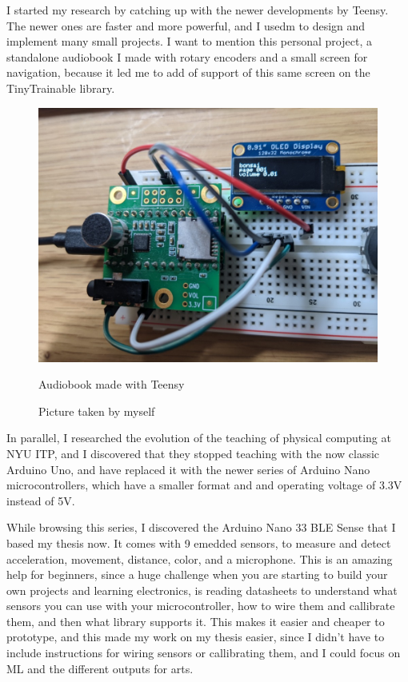 I started my research by catching up with the newer developments by Teensy. The newer ones are faster and more powerful, and I usedm to design and implement many small projects. I want to mention this personal project, a standalone audiobook I made with rotary encoders and a small screen for navigation, because it led me to add of support of this same screen on the TinyTrainable library.

\begin{figure}[ht]
  \centering
  \includegraphics[width=0.75\linewidth,height=0.40\textheight,keepaspectratio]{images/bonsai.jpg}
  \caption{Audiobook made with Teensy}
  \caption*{Picture taken by myself}
  \label{fig:bonsai-audiobook}
\end{figure}

In parallel, I researched the evolution of the teaching of physical computing at \acrshort{NYU} \acrshort{ITP}, and I discovered that they stopped teaching with the now classic Arduino Uno, and have replaced it with the newer series of Arduino Nano microcontrollers, which have a smaller format and and operating voltage of 3.3V instead of 5V.

While browsing this series, I discovered the Arduino Nano 33 \acrshort{BLE} Sense that I based my thesis now. It comes with 9 emedded sensors, to measure and detect acceleration, movement, distance, color, and a microphone. This is an amazing help for beginners, since a huge challenge when you are starting to build your own projects and learning electronics, is reading datasheets to understand what sensors you can use with your microcontroller, how to wire them and callibrate them, and then what library supports it. This makes it easier and cheaper to prototype, and this made my work on my thesis easier, since I didn't have to include instructions for wiring sensors or callibrating them, and I could focus on \acrshort{ML} and the different outputs for arts.
